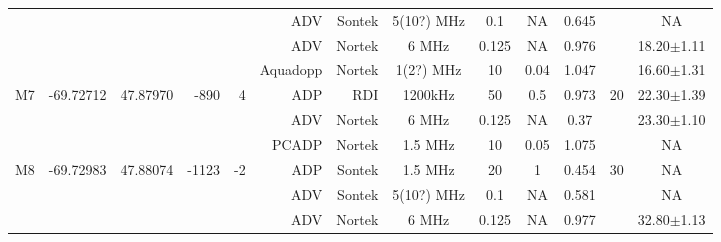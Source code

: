 \documentclass[letterpaper,10pt,landscape]{article}
\begin{document}
\begin{table}
\begin{tabular}{|r|c|c|r|r|r|r|c|c|c|c|c|c|}
    ~                   &                            &                           &                        &                       & ADV          & Sontek     & 5(10?) MHz& 0.1       & NA       & 0.645      &                    &  NA               \\ 
    ~                   &                            &                           &                        &                       & ADV          & Nortek     & 6 MHz     & 0.125     & NA       & 0.976      &                    &  18.20$\pm$1.11   \\ %
    ~                   &                            &                           &                        &                       & Aquadopp     & Nortek     & 1(2?) MHz & 10        & 0.04     & 1.047      &                    &  16.60$\pm$1.31   \\\hline
    \multirow{3}{*}{M7} & \multirow{3}{*}{-69.72712} & \multirow{3}{*}{47.87970} & \multirow{3}{*}{-890}  & \multirow{3}{*}{4}    & ADP          & RDI        & 1200kHz   & 50        & 0.5      & 0.973      & \multirow{3}{*}{20}&  22.30$\pm$1.39   \\ 
    ~                   &                            &                           &                        &                       & ADV          & Nortek     & 6 MHz     & 0.125     & NA       & 0.37       &                    &  23.30$\pm$1.10   \\ %
    ~                   &                            &                           &                        &                       & PCADP        & Nortek     & 1.5 MHz   & 10        & 0.05     & 1.075      &                    &  NA               \\\hline
    \multirow{4}{*}{M8} & \multirow{4}{*}{-69.72983} & \multirow{4}{*}{47.88074} & \multirow{4}{*}{-1123} & \multirow{4}{*}{-2}   & ADP          & Sontek     & 1.5 MHz   & 20        & 1        & 0.454      & \multirow{4}{*}{30}&  NA               \\ 
    ~                   &                            &                           &                        &                       & ADV          & Sontek     & 5(10?) MHz& 0.1       & NA       & 0.581      &                    &  NA               \\ 
    ~                   &                            &                           &                        &                       & ADV          & Nortek     & 6 MHz     & 0.125     & NA       & 0.977      &                    &  32.80$\pm$1.13   \\ %

\end{tabular}
\end{table}
\end{document}

